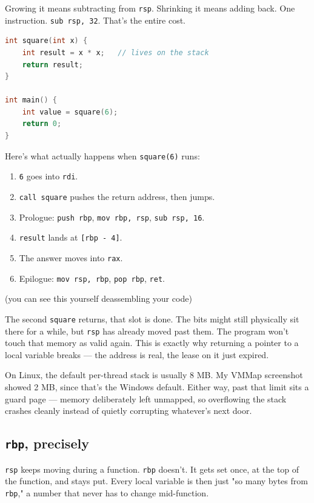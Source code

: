 \documentclass[11pt,a4paper]{article}
\begin{document}
Growing it means subtracting from \texttt{rsp}. Shrinking it means adding back. One instruction. \texttt{sub rsp, 32}. That's the entire cost.

\begin{lstlisting}[language=C++]
int square(int x) {
    int result = x * x;   // lives on the stack
    return result;
}

int main() {
    int value = square(6);
    return 0;
}
\end{lstlisting}

Here's what actually happens when \texttt{square(6)} runs:

\begin{enumerate}
\item \texttt{6} goes into \texttt{rdi}.
\item \texttt{call square} pushes the return address, then jumps.
\item Prologue: \texttt{push rbp}, \texttt{mov rbp, rsp}, \texttt{sub rsp, 16}.
\item \texttt{result} lands at \texttt{[rbp - 4]}.
\item The answer moves into \texttt{rax}.
\item Epilogue: \texttt{mov rsp, rbp}, \texttt{pop rbp}, \texttt{ret}.
\end{enumerate}

(you can see this yourself deassembling your code)

The second \texttt{square} returns, that slot is done. The bits might still physically sit there for a while, but \texttt{rsp} has already moved past them. The program won't touch that memory as valid again. This is exactly why returning a pointer to a local variable breaks --- the address is real, the lease on it just expired.

On Linux, the default per-thread stack is usually 8 MB. My VMMap screenshot showed 2 MB, since that's the Windows default. Either way, past that limit sits a guard page --- memory deliberately left unmapped, so overflowing the stack crashes cleanly instead of quietly corrupting whatever's next door.

\subsection{\texttt{rbp}, precisely}

\texttt{rsp} keeps moving during a function. \texttt{rbp} doesn't. It gets set once, at the top of the function, and stays put. Every local variable is then just "so many bytes from \texttt{rbp}," a number that never has to change mid-function.
\end{document}
